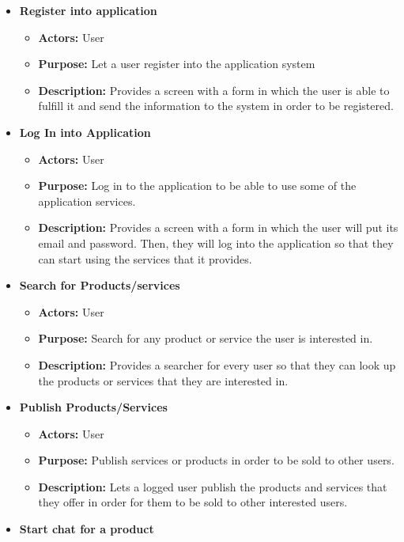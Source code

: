 \documentclass[./main.tex]{subfiles}
\begin{document}
\begin{itemize}

\item
  \textbf{Register into application}

  \begin{itemize}
  
  \item
    \textbf{Actors:} User
  \item
    \textbf{Purpose:} Let a user register into the application system
  \item
    \textbf{Description:} Provides a screen with a form in which the
    user is able to fulfill it and send the information to the system in
    order to be registered.
  \end{itemize}
\item
  \textbf{Log In into Application}

  \begin{itemize}
  
  \item
    \textbf{Actors:} User
  \item
    \textbf{Purpose:} Log in to the application to be able to use some
    of the application services.
  \item
    \textbf{Description:} Provides a screen with a form in which the
    user will put its email and password. Then, they will log into the
    application so that they can start using the services that it provides.
  \end{itemize}
\item
  \textbf{Search for Products/services}

  \begin{itemize}
  
  \item
    \textbf{Actors:} User
  \item
    \textbf{Purpose:} Search for any product or service the user is
    interested in.
  \item
    \textbf{Description:} Provides a searcher for every user so that
    they can look up the products or services that they are interested
    in.
  \end{itemize}
\item
  \textbf{Publish Products/Services}

  \begin{itemize}
  
  \item
    \textbf{Actors:} User
  \item
    \textbf{Purpose:} Publish services or products in order to be sold
    to other users.
  \item
    \textbf{Description:} Lets a logged user publish the products and
    services that they offer in order for them to be sold to other
    interested users.
  \end{itemize}
\item
  \textbf{Start chat for a product}


\end{itemize}
\end{document}
